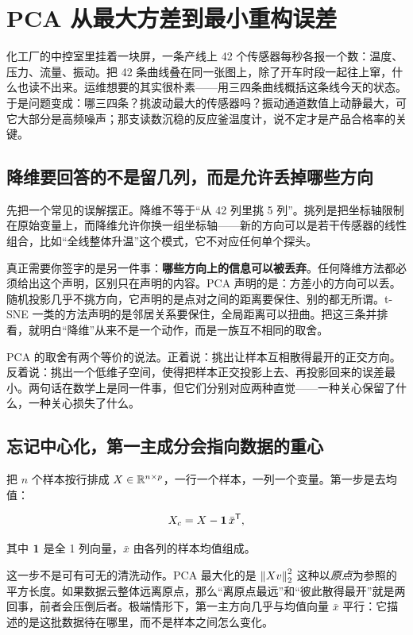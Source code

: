 \section{PCA 从最大方差到最小重构误差}
\label{sec:13-Machine-Learning/04-Dimensionality-Reduction/01}

化工厂的中控室里挂着一块屏，一条产线上 42 个传感器每秒各报一个数：温度、压力、流量、振动。把 42 条曲线叠在同一张图上，除了开车时段一起往上窜，什么也读不出来。运维想要的其实很朴素——用三四条曲线概括这条线今天的状态。于是问题变成：哪三四条？挑波动最大的传感器吗？振动通道数值上动静最大，可它大部分是高频噪声；那支读数沉稳的反应釜温度计，说不定才是产品合格率的关键。

\subsection{降维要回答的不是留几列，而是允许丢掉哪些方向}

先把一个常见的误解摆正。降维不等于``从 42 列里挑 5 列''。挑列是把坐标轴限制在原始变量上，而降维允许你换一组坐标轴——新的方向可以是若干传感器的线性组合，比如``全线整体升温''这个模式，它不对应任何单个探头。

真正需要你签字的是另一件事：\textbf{哪些方向上的信息可以被丢弃}。任何降维方法都必须给出这个声明，区别只在声明的内容。PCA 声明的是：方差小的方向可以丢。随机投影几乎不挑方向，它声明的是点对之间的距离要保住、别的都无所谓。t-SNE 一类的方法声明的是邻居关系要保住，全局距离可以扭曲。把这三条并排看，就明白``降维''从来不是一个动作，而是一族互不相同的取舍。

PCA 的取舍有两个等价的说法。正着说：挑出让样本互相散得最开的正交方向。反着说：挑出一个低维子空间，使得把样本正交投影上去、再投影回来的误差最小。两句话在数学上是同一件事，但它们分别对应两种直觉——一种关心保留了什么，一种关心损失了什么。

\subsection{忘记中心化，第一主成分会指向数据的重心}

把 \(n\) 个样本按行排成 \(X\in\mathbb{R}^{n\times p}\)，一行一个样本，一列一个变量。第一步是去均值：

\[
X_c = X - \mathbf{1}\,\bar x^{\mathsf{T}},
\]

其中 \(\mathbf{1}\) 是全 1 列向量，\(\bar x\) 由各列的样本均值组成。

这一步不是可有可无的清洗动作。PCA 最大化的是 \(\left\lVert Xv\right\rVert_2^2\) 这种以\emph{原点}为参照的平方长度。如果数据云整体远离原点，那么``离原点最远''和``彼此散得最开''就是两回事，前者会压倒后者。极端情形下，第一主方向几乎与均值向量 \(\bar x\) 平行：它描述的是这批数据待在哪里，而不是样本之间怎么变化。

